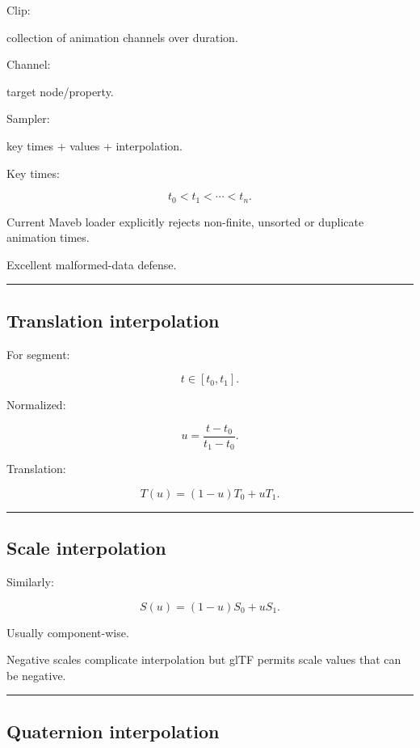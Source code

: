 Clip:

collection of animation channels over duration.

Channel:

target node/property.

Sampler:

key times + values + interpolation.

Key times:

\[
t_0<t_1<\cdots<t_n.
\]

Current Maveb loader explicitly rejects non-finite, unsorted or duplicate animation times.

Excellent malformed-data defense.

\begin{center}\rule{0.5\linewidth}{0.5pt}\end{center}

\subsection{Translation interpolation}\label{04-visual-computing-ii-ch041-translation-interpolation}

For segment:

\[
t\in[t_0,t_1].
\]

Normalized:

\[
u=
\frac{t-t_0}{t_1-t_0}.
\]

Translation:

\[
\boxed{
T(u)
=
(1-u)T_0+uT_1.
}
\]

\begin{center}\rule{0.5\linewidth}{0.5pt}\end{center}

\subsection{Scale interpolation}\label{04-visual-computing-ii-ch041-scale-interpolation}

Similarly:

\[
\boxed{
S(u)
=
(1-u)S_0+uS_1.
}
\]

Usually component-wise.

Negative scales complicate interpolation but glTF permits scale values that can be negative.

\begin{center}\rule{0.5\linewidth}{0.5pt}\end{center}

\subsection{Quaternion interpolation}\label{04-visual-computing-ii-ch041-quaternion-interpolation}

